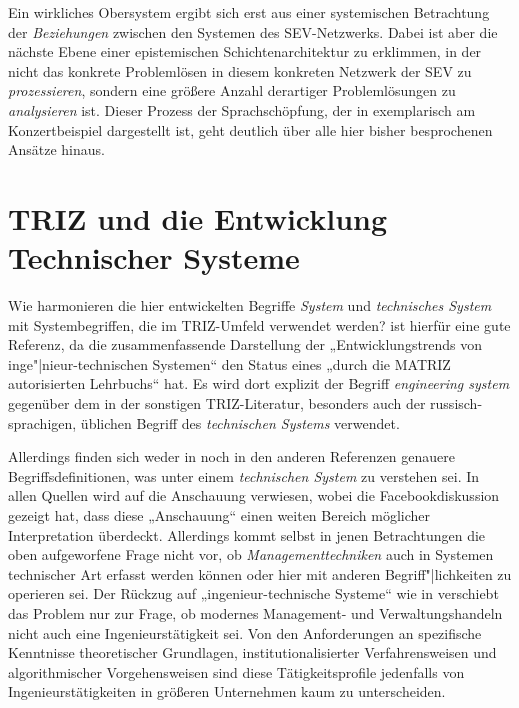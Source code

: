 \documentclass[12pt,a4paper]{article}
\begin{document}
Ein wirkliches Obersystem ergibt sich erst aus einer systemischen Betrachtung
der \emph{Beziehungen} zwischen den Systemen des SEV-Netzwerks. Dabei ist aber
die nächste Ebene einer epistemischen Schichtenarchitektur zu erklimmen, in
der nicht das konkrete Problemlösen in diesem konkreten Netzwerk der SEV zu
\emph{prozessieren}, sondern eine größere Anzahl derartiger Problemlösungen zu
\emph{analysieren} ist.  Dieser Prozess der Sprachschöpfung, der in
\cite{Graebe2020b} exemplarisch am Konzertbeispiel dargestellt ist, geht
deutlich über alle hier bisher besprochenen Ansätze hinaus. 

\section{TRIZ und die Entwicklung Technischer Systeme}

Wie harmonieren die hier entwickelten Begriffe \emph{System} und
\emph{technisches System} mit Systembegriffen, die im TRIZ-Umfeld verwendet
werden?  \cite{TESE2018} ist hierfür eine gute Referenz, da die
zusammenfassende Darstellung der „Entwicklungstrends von
inge"|nieur-technischen Systemen“ den Status eines „durch die MATRIZ
autorisierten Lehrbuchs“ hat. Es wird dort explizit der Begriff
\emph{engineering system} gegenüber dem in der sonstigen TRIZ-Literatur,
besonders auch der russisch-sprachigen, üblichen Begriff des \emph{technischen
  Systems} verwendet.

Allerdings finden sich weder in \cite{TESE2018} noch in den anderen Referenzen
genauere Begriffsdefinitionen, was unter einem \emph{technischen System} zu
verstehen sei.  In allen Quellen wird auf die Anschauung verwiesen, wobei die
Facebookdiskussion \cite{Graebe2019b} gezeigt hat, dass diese „Anschauung“
einen weiten Bereich möglicher Interpretation überdeckt.  Allerdings kommt
selbst in jenen Betrachtungen die oben aufgeworfene Frage nicht vor, ob
\emph{Managementtechniken} auch in Systemen technischer Art erfasst werden
können oder hier mit anderen Begriff"|lichkeiten zu operieren sei. Der Rückzug
auf „ingenieur-technische Systeme“ wie in \cite{TESE2018} verschiebt das
Problem nur zur Frage, ob modernes Management- und Verwaltungshandeln nicht
auch eine Ingenieurstätigkeit sei.  Von den Anforderungen an spezifische
Kenntnisse theoretischer Grundlagen, institutionalisierter Verfahrensweisen
und algorithmischer Vorgehensweisen sind diese Tätigkeitsprofile jedenfalls
von Ingenieurstätigkeiten in größeren Unternehmen kaum zu unterscheiden.
\end{document}
